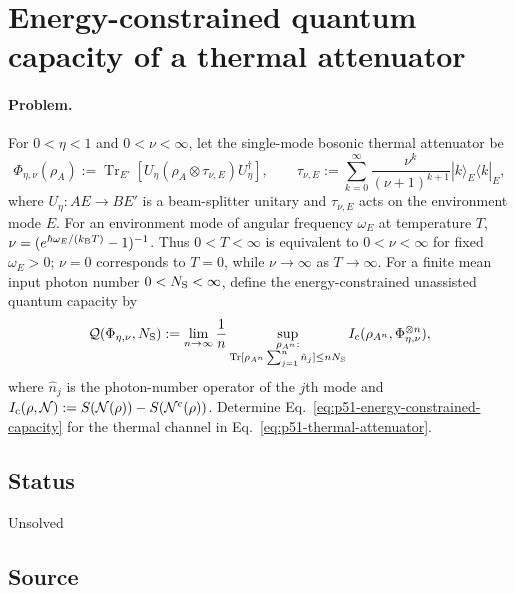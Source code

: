 \section{Energy-constrained quantum capacity of a thermal attenuator}
\label{sec:problem-51}

\paragraph{Problem.}
For $0<\eta<1$ and $0<\nu<\infty$, let the single-mode bosonic thermal
attenuator be
\begin{equation}
  \Phi_{\eta,\nu}(\rho_A)
  :=\operatorname{Tr}_{E'}\!\left[
     U_\eta(\rho_A\otimes\tau_{\nu,E})U_\eta^\dagger
  \right],
  \qquad
  \tau_{\nu,E}:=\sum_{k=0}^{\infty}
     \frac{\nu^k}{(\nu+1)^{k+1}}
     |k\rangle_E\!\langle k|_E,
  \label{eq:p51-thermal-attenuator}
\end{equation}
where $U_\eta:AE\to BE'$ is a beam-splitter unitary and
$\tau_{\nu,E}$ acts on the environment mode $E$.  For an environment mode
of angular frequency $\omega_E$ at temperature $T$,
$\nu=(e^{\hbar\omega_E/(k_{\rm B}T)}-1)^{-1}$.  Thus $0<T<\infty$ is
equivalent to $0<\nu<\infty$ for fixed $\omega_E>0$; $\nu=0$ corresponds
to $T=0$, while $\nu\to\infty$ as $T\to\infty$.  For a finite mean input photon
number $0<N_{\rm S}<\infty$, define the energy-constrained unassisted quantum
capacity by
\begin{equation}
  \mathcal Q(\Phi_{\eta,\nu},N_{\rm S})
  :=\lim_{n\to\infty}\frac1n
  \sup_{\substack{\rho_{A^n}:\\
       \operatorname{Tr}[\rho_{A^n}\sum_{j=1}^n\hat n_j]
       \leq nN_{\rm S}}}
       I_{\rm c}(\rho_{A^n},\Phi_{\eta,\nu}^{\otimes n}),
  \label{eq:p51-energy-constrained-capacity}
\end{equation}
where $\hat n_j$ is the photon-number operator of the $j$th mode and
$I_{\rm c}(\rho,\mathcal N)
:=S(\mathcal N(\rho))-S(\mathcal N^{\rm c}(\rho))$.  Determine
Eq.~\eqref{eq:p51-energy-constrained-capacity} for the thermal channel in
Eq.~\eqref{eq:p51-thermal-attenuator}.

\subsection*{Status}

Unsolved

\subsection*{Source}

